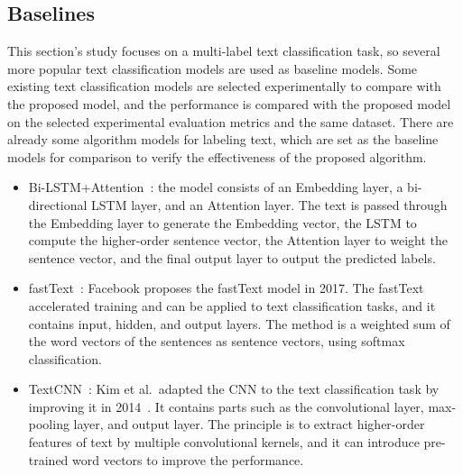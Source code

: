 \subsection{Baselines}
This section's study focuses on a multi-label text classification task, so several more popular text classification models are used as baseline models. Some existing text classification models are selected experimentally to compare with the proposed model, and the performance is compared with the proposed model on the selected experimental evaluation metrics and the same dataset. There are already some algorithm models for labeling text, which are set as the baseline models for comparison to verify the effectiveness of the proposed algorithm.
\begin{itemize}
    \item Bi-LSTM+Attention~\cite{zhou2016attention}: the model consists of an Embedding layer, a bi-directional LSTM layer, and an Attention layer. The text is passed through the Embedding layer to generate the Embedding vector, the LSTM to compute the higher-order sentence vector, the Attention layer to weight the sentence vector, and the final output layer to output the predicted labels.
    \item fastText~\cite{joulin-etal-2017-bag}: Facebook proposes the fastText model in 2017. The fastText accelerated training and can be applied to text classification tasks, and it contains input, hidden, and output layers. The method is a weighted sum of the word vectors of the sentences as sentence vectors, using softmax classification.
    \item TextCNN~\cite{guo2019improving}: Kim et al.\ adapted the CNN to the text classification task by improving it in 2014~\cite{kim-2014-convolutional}. It contains parts such as the convolutional layer, max-pooling layer, and output layer. The principle is to extract higher-order features of text by multiple convolutional kernels, and it can introduce pre-trained word vectors to improve the performance.

\end{itemize}

